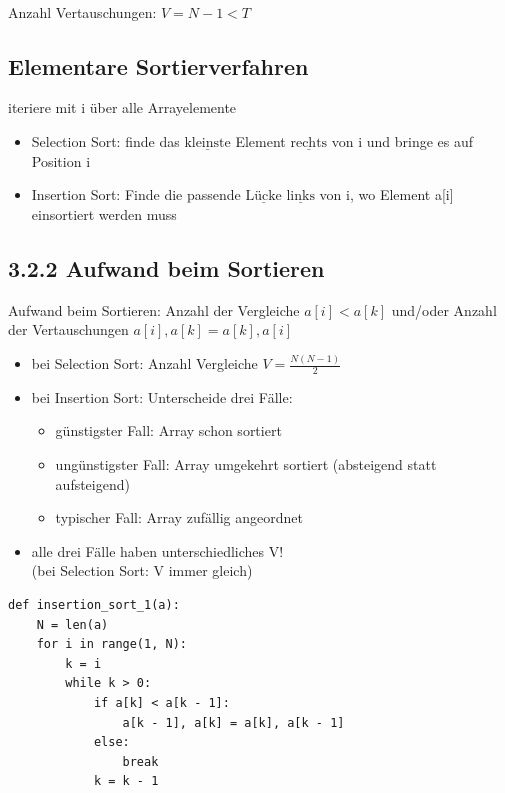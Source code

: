 \documentclass[11pt, fleqn]{scrreprt}
\begin{document}
    \\

    Anzahl Vertauschungen: $ V = N-1 < T$


    \subsection*{Elementare Sortierverfahren}
    iteriere mit i über alle Arrayelemente

    \begin{itemize}
        \item Selection Sort: finde das $\underline{\text{kleinste}}$ Element $\underline{\text{rechts}}$ von i und bringe es auf Position i
        \item Insertion Sort: Finde die passende $\underline{\text{Lücke}}$ $\underline{\text{links}}$ von i, wo Element a[i] einsortiert werden muss

    \end{itemize}

    \subsection*{3.2.2 Aufwand beim Sortieren}
    Aufwand beim Sortieren: Anzahl der Vergleiche $a[i] < a[k]$ und/oder Anzahl der Vertauschungen $a[i],a[k] = a[k], a[i]$

    \begin{itemize}
        \item bei Selection Sort: Anzahl Vergleiche $V = \frac{N(N-1)}{2}$
        \item bei Insertion Sort: Unterscheide drei Fälle:
        \begin{itemize}
            \item günstigster Fall: Array schon sortiert
            \item ungünstigster Fall: Array umgekehrt sortiert (absteigend statt aufsteigend)
            \item typischer Fall: Array zufällig angeordnet
        \end{itemize}
        \item alle drei Fälle haben unterschiedliches V! \\
        (bei Selection Sort: V immer gleich)

    \end{itemize}

    \begin{verbatim}
def insertion_sort_1(a):
    N = len(a)
    for i in range(1, N):
        k = i
        while k > 0:
            if a[k] < a[k - 1]:
                a[k - 1], a[k] = a[k], a[k - 1]
            else:
                break
            k = k - 1
    \end{verbatim}
\end{document}
